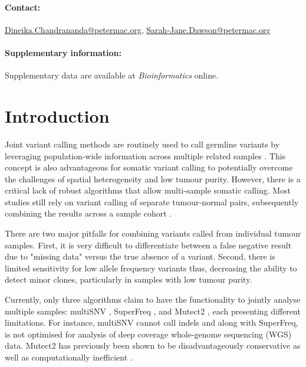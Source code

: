 \paragraph*{\textbf{Contact:}} \href{Dineika.Chandrananda@petermac.org}{Dineika.Chandrananda@petermac.org}, \href{Sarah-Jane.Dawson@petermac.org}{Sarah-Jane.Dawson@petermac.org}
\vspace{-2em}
\paragraph*{\textbf{Supplementary information:}} Supplementary data are available at \textit{Bioinformatics}
online.



\section{Introduction}
Joint variant calling methods are routinely used to call germline variants by leveraging population-wide information across multiple related samples \parencite{DePristo2011,Toptas2018}. This concept is also advantageous for somatic variant calling to potentially overcome the challenges of spatial heterogeneity and low tumour purity. However, there is a critical lack of robust algorithms that allow multi-sample somatic calling. Most studies still rely on variant calling of separate tumour-normal pairs, subsequently combining the results across a sample cohort \parencite{Hu2019, Leong2018, Wang2018}.

There are two major pitfalls for combining variants called from individual tumour samples. First, it is very difficult to differentiate between a false negative result due to "missing data" versus the true absence of a variant. Second, there is limited sensitivity for low allele frequency variants thus, decreasing the ability to detect minor clones, particularly in samples with low tumour purity.

Currently, only three algorithms claim to have the functionality to jointly analyse multiple samples: multiSNV \parencite{Josephidou2015}, SuperFreq \parencite{Flensburg2020}, and Mutect2 \parencite{Benjamin2019}, each presenting different limitations. For instance, multiSNV cannot call indels and along with SuperFreq, is not optimised for analysis of deep coverage whole-genome sequencing (WGS) data. Mutect2 has previously been shown to be disadvantageously conservative as well as computationally inefficient \parencite{Chen2020a}.


